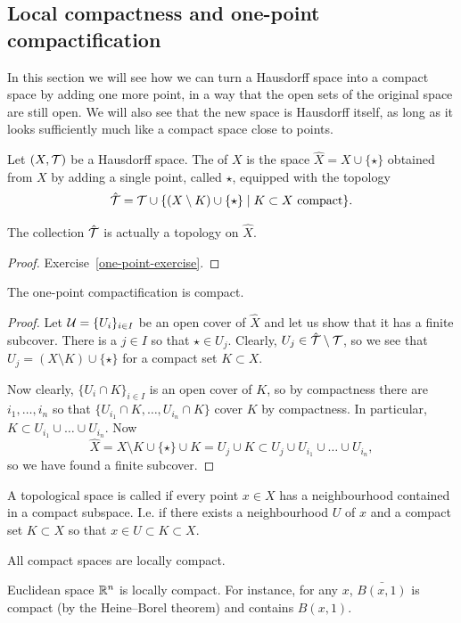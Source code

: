 \subsection{Local compactness and one-point compactification}
In this section we will see how we can turn a Hausdorff space into a compact space by adding one more point, in a way that the open sets of the original space are still open. We will also see that the new space is Hausdorff itself, as long as it looks sufficiently much like a compact space close to points.
\begin{defn}
  Let $(X,\mathcal{T})$ be a Hausdorff space. The  of $X$ is the space $\hat{X} = X \cup \{\star\}$ obtained from $X$ by adding a single point, called $\star$, equipped with the topology
  \[
    \hat{\mathcal{T}} = \mathcal{T} \cup \{ (X \setminus K) \cup \{\star\} \mid \text{$K \subset X$ compact} \}.
  \]
\end{defn}
\begin{prop}
  The collection $\hat{\mathcal{T}}$ is actually a topology on $\hat{X}$.
\end{prop}
\begin{proof}
  Exercise~\ref{one-point-exercise}.
\end{proof}
\begin{prop}
  The one-point compactification is compact.
\end{prop}
\begin{proof}
  Let $\mathcal{U} = \{U_i\}_{i \in I}$ be an open cover of $\hat{X}$ and let us show that it has a finite subcover. There is a $j \in I$ so that $\star \in U_j$. Clearly, $U_j \in \hat{\mathcal{T}} \setminus \mathcal{T}$, so we see that $U_j = (X \setminus K) \cup \{\star\}$ for a compact set $K \subset X$.
  
  Now clearly, $\{U_i \cap K\}_{i \in I}$ is an open cover of $K$, so by compactness there are $i_1, \dots, i_n$ so that $\{U_{i_1} \cap K, \dots, U_{i_n} \cap K\}$ cover $K$ by compactness. In particular, $K \subset U_{i_1} \cup \dots \cup U_{i_n}$. Now
  \[
    \hat{X} = X \setminus K \cup \{\star\} \cup K = U_j \cup K \subset U_j \cup U_{i_1} \cup \dots \cup U_{i_n},
  \]
  so we have found a finite subcover.
\end{proof}

\begin{defn}
  A topological space is called  if every point $x \in X$ has a neighbourhood contained in a compact subspace. I.e. if there exists a neighbourhood $U$ of $x$ and a compact set $K \subset X$ so that $x \in U \subset K \subset X$.
\end{defn}
\begin{example}
  All compact spaces are locally compact.
\end{example}
\begin{example}
  Euclidean space $\mathbb{R}^n$ is locally compact. For instance, for any $x$, $\bar{B(x,1)}$ is compact (by the Heine--Borel theorem) and contains $B(x,1)$.
\end{example}
\begin{example}
  
\end{example}
